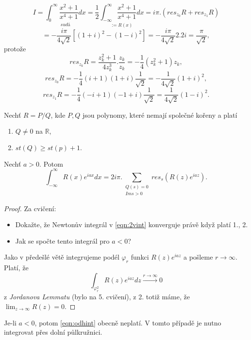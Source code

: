 \begin{example}
$$I=\underset{sudá}{\int_0^\infty{\frac{x^2+1}{x^4+1}}dx}
=\frac{1}{2}\underset{:=R(x)}{\int_{-\infty}^\infty\frac{x^2+1}
{x^4+1}dx}=i\pi.(res_{z_0}R+res_{z_1}R)$$
$$=-\frac{i\pi}{4\sqrt{2}}\left[(1+i)^2-(1-i)^2\right]=-\frac{i\pi}{4\sqrt{2}}2.2i=\frac{\pi}{\sqrt{2}},$$ protože
$${res}_{z_k}R=\frac{z_k^2+1}{4z^3_k}.\frac{z_k}{z_k}=
-\frac{1}{4}(z_k^2+1)z_k,$$
$${res}_{z_0}R=-\frac{1}{4}(i+1)(1+i)\frac{1}{\sqrt{2}}=-\frac{1}{4\sqrt{2}}(1+i)^2,$$
$${res}_{z_1}R=-\frac{1}{4}(-i+1)(-1+i)\frac{1}{\sqrt{2}}=\frac{1}{4\sqrt{2}}(1-i)^2.$$
\end{example}

\begin{theorem}
Nechť $R=P/Q$, kde $P,Q$ jsou polynomy, které nemají společné kořeny a platí
\begin{enumerate}
    \item $Q\neq 0$ na $\mathbb{R}$,
    \item $st(Q)\geq st(p)+1$.
\end{enumerate}
Nechť $a>0$. Potom
\begin{equation}
    \label{eqn:2vint}
    \int_{-\infty}^\infty{R(x)e^{iax}}dx = 2i\pi.\sum_{\begin{array}{cc}
         Q(s)=0  \\
         {Im}{s}>0 
    \end{array}}{res_s\left({R(z)e^{iaz}}\right)}.
\end{equation}
\end{theorem}
\begin{proof}
Za cvičení:
\begin{itemize}
    \item Dokažte, že Newtonův integrál v \cref{eqn:2vint} konverguje právě když platí 1., 2.
    \item Jak se spočte tento integrál pro $a<0$?
\end{itemize}
Jako v předešlé větě integrujeme podél $\varphi_r$ funkci $R(z)e^{iaz}$ a pošleme $r\to\infty$. Platí, že
\begin{equation}
    \int_{\varphi_r^2}{R(z)e^{iaz}}dz\overset{r\to\infty}{\longrightarrow}0
    \label{eqn:odhint}
\end{equation}
z \textit{Jordanova Lemmatu} (bylo na 5. cvičení), z 2. totiž máme, že $\lim_{z\to\infty}R(z)=0$.
\end{proof}

\begin{note}
Je-li $a<0$, potom \cref{eqn:odhint} obecně neplatí. V tomto případě je nutno integrovat přes dolní půlkružnici.
\end{note}

